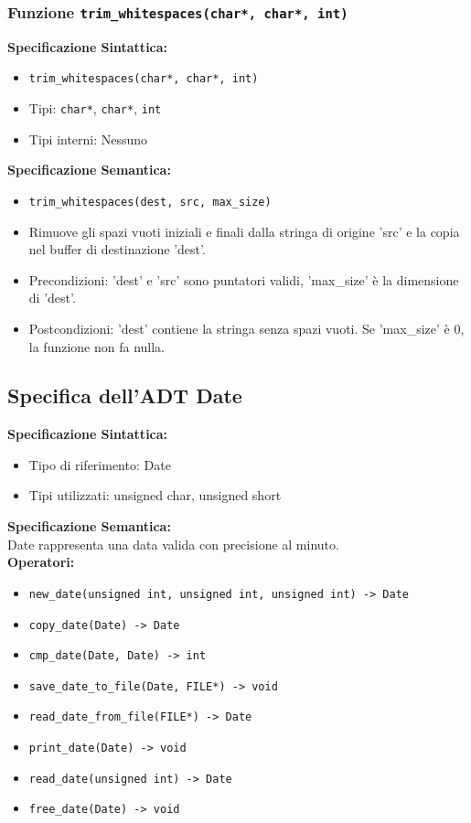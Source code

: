 \documentclass[11pt]{scrartcl} %
\begin{document}
\subsubsection{Funzione \texttt{trim\_whitespaces(char*, char*, int)}}

\textbf{Specificazione Sintattica:}
\begin{itemize}
	\item \texttt{trim\_whitespaces(char*, char*, int)}
	\item Tipi: \texttt{char*}, \texttt{char*}, \texttt{int}
	\item Tipi interni: Nessuno
\end{itemize}

\textbf{Specificazione Semantica:}
\begin{itemize}
	\item \texttt{trim\_whitespaces(dest, src, max\_size)}
	\item Rimuove gli spazi vuoti iniziali e finali dalla stringa di origine 'src' e la copia nel buffer di destinazione 'dest'.
	\item Precondizioni: 'dest' e 'src' sono puntatori validi, 'max\_size' è la dimensione di 'dest'.
	\item Postcondizioni: 'dest' contiene la stringa senza spazi vuoti. Se 'max\_size' è 0, la funzione non fa nulla.
\end{itemize}

\subsection{Specifica dell'ADT Date}


\textbf{Specificazione Sintattica:}
\begin{itemize}
	\item Tipo di riferimento: Date
	\item Tipi utilizzati: unsigned char, unsigned short
\end{itemize}

\textbf{Specificazione Semantica:} \\
Date rappresenta una data valida con precisione al minuto. \\

\textbf{Operatori:}
\begin{itemize}
    \item \texttt{new\_date(unsigned int, unsigned int, unsigned int) -> Date}
    \item \texttt{copy\_date(Date) -> Date}
    \item \texttt{cmp\_date(Date, Date) -> int}
    \item \texttt{save\_date\_to\_file(Date, FILE*) -> void}
    \item \texttt{read\_date\_from\_file(FILE*) -> Date}
    \item \texttt{print\_date(Date) -> void}
    \item \texttt{read\_date(unsigned int) -> Date}
    \item \texttt{free\_date(Date) -> void}
\end{itemize}
\end{document}
